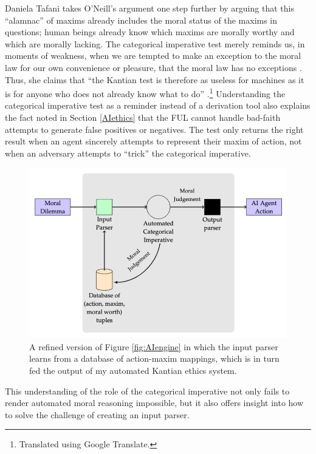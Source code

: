 \begin{isabellebody}
\begin{isamarkuptext}
Daniela Tafani takes O'Neill's argument one step further by arguing that this ``alamnac'' of maxims already 
includes the moral status of the maxims in questions; human beings already
know which maxims are morally worthy and which are morally lacking. The categorical imperative test
merely reminds us, in moments of weakness, when we are tempted to make an exception to the moral law for 
our own convenience or pleasure, that the moral law has no exceptions \citep[9]{tafani}. Thus, she claims
that ``the Kantian test is therefore as useless for machines as it is for anyone who does
not already know what to do'' \citep[8]{tafani}.\footnote{Translated using Google Translate.} 
Understanding the categorical imperative test as a reminder
instead of a derivation tool also explains the fact noted in Section \ref{AIethics} that the FUL cannot 
handle bad-faith attempts to generate false positives or negatives. The test only returns the right 
result when an agent sincerely attempts to represent their maxim of action, not when an adversary attempts
 to ``trick'' the categorical imperative.%
\end{isamarkuptext}\isamarkuptrue%
%
\begin{figure}
\centering
\includegraphics[scale=0.47]{inputparser.png}
\caption{A refined version of Figure \ref{fig:AIengine} in which the input parser learns from a database
of action-maxim mappings, which is in turn fed the output of my automated Kantian ethics system. } \label{fig:inputparser}
\end{figure}
%
\begin{isamarkuptext}%
This understanding of the role of the categorical imperative not only fails to render automated moral
reasoning impossible, but it also offers insight into how to solve the challenge of creating an input parser.

\end{isamarkuptext}
\end{isabellebody}

